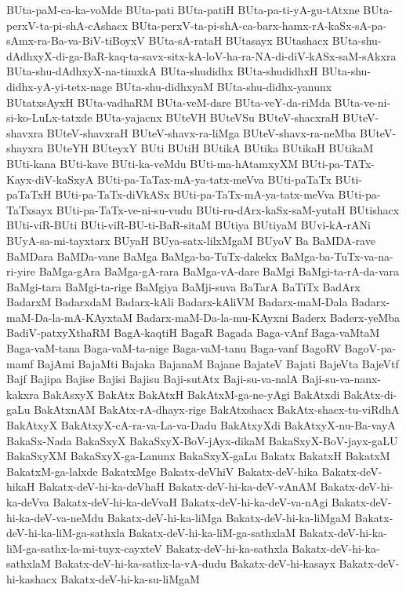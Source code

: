 {BUta-paM-ca-ka-voMde
BUta-pati
BUta-patiH
BUta-pa-ti-yA-gu-tAtxne
BUta-perxV-ta-pi-shA-cAshacx
BUta-perxV-ta-pi-shA-ca-barx-hamx-rA-kaSx-sA-pa-sAmx-ra-Ba-va-BiV-tiBoyxV
BUta-sA-rataH
BUtasayx
BUtashacx
BUta-shu-dAdhxyX-di-ga-BaR-kaq-ta-savx-sitx-kA-loV-ha-ra-NA-di-diV-kASx-saM-sAkxra
BUta-shu-dAdhxyX-na-timxkA
BUta-shudidhx
BUta-shudidhxH
BUta-shu-didhx-yA-yi-tetx-nage
BUta-shu-didhxyaM
BUta-shu-didhx-yanunx
BUtatxsAyxH
BUta-vadhaRM
BUta-veM-dare
BUta-veY-da-riMda
BUta-ve-ni-si-ko-LuLx-tatxde
BUta-yajacnx
BUteVH
BUteVSu
BUteV-shacxraH
BUteV-shavxra
BUteV-shavxraH
BUteV-shavx-ra-liMga
BUteV-shavx-ra-neMba
BUteV-shayxra
BUteYH
BUteyxY
BUti
BUtiH
BUtikA
BUtika
BUtikaH
BUtikaM
BUti-kana
BUti-kave
BUti-ka-veMdu
BUti-ma-hAtamxyXM
BUti-pa-TATx-Kayx-diV-kaSxyA
BUti-pa-TaTax-mA-ya-tatx-meVva
BUti-paTaTx
BUti-paTaTxH
BUti-pa-TaTx-diVkASx
BUti-pa-TaTx-mA-ya-tatx-meVva
BUti-pa-TaTxsayx
BUti-pa-TaTx-ve-ni-su-vudu
BUti-ru-dArx-kaSx-saM-yutaH
BUtishacx
BUti-viR-BUti
BUti-viR-BU-ti-BaR-sitaM
BUtiya
BUtiyaM
BUvi-kA-rANi
BUyA-sa-mi-tayxtarx
BUyaH
BUya-satx-lilxMgaM
BUyoV
Ba
BaMDA-rave
BaMDara
BaMDa-vane
BaMga
BaMga-ba-TuTx-dakekx
BaMga-ba-TuTx-va-na-ri-yire
BaMga-gAra
BaMga-gA-rara
BaMga-vA-dare
BaMgi
BaMgi-ta-rA-da-vara
BaMgi-tara
BaMgi-ta-rige
BaMgiya
BaMji-suva
BaTarA
BaTiTx
BadArx
BadarxM
BadarxdaM
Badarx-kAli
Badarx-kAliVM
Badarx-maM-Dala
Badarx-maM-Da-la-mA-KAyxtaM
Badarx-maM-Da-la-mu-KAyxni
Baderx
Baderx-yeMba
BadiV-patxyXthaRM
BagA-kaqtiH
BagaR
Bagada
Baga-vAnf
Baga-vaMtaM
Baga-vaM-tana
Baga-vaM-ta-nige
Baga-vaM-tanu
Baga-vanf
BagoRV
BagoV-pa-mamf
BajAmi
BajaMti
Bajaka
BajanaM
Bajane
BajateV
Bajati
BajeVta
BajeVtf
Bajf
Bajipa
Bajise
Bajisi
Bajisu
Baji-sutAtx
Baji-su-va-nalA
Baji-su-va-nanx-kakxra
BakAsxyX
BakAtx
BakAtxH
BakAtxM-ga-ne-yAgi
BakAtxdi
BakAtx-di-gaLu
BakAtxnAM
BakAtx-rA-dhayx-rige
BakAtxshacx
BakAtx-shacx-tu-viRdhA
BakAtxyX
BakAtxyX-cA-ra-va-La-va-Dadu
BakAtxyXdi
BakAtxyX-nu-Ba-vayA
BakaSx-Nada
BakaSxyX
BakaSxyX-BoV-jAyx-dikaM
BakaSxyX-BoV-jayx-gaLU
BakaSxyXM
BakaSxyX-ga-Lanunx
BakaSxyX-gaLu
Bakatx
BakatxH
BakatxM
BakatxM-ga-lalxde
BakatxMge
Bakatx-deVhiV
Bakatx-deV-hika
Bakatx-deV-hikaH
Bakatx-deV-hi-ka-deVhaH
Bakatx-deV-hi-ka-deV-vAnAM
Bakatx-deV-hi-ka-deVva
Bakatx-deV-hi-ka-deVvaH
Bakatx-deV-hi-ka-deV-va-nAgi
Bakatx-deV-hi-ka-deV-va-neMdu
Bakatx-deV-hi-ka-liMga
Bakatx-deV-hi-ka-liMgaM
Bakatx-deV-hi-ka-liM-ga-sathxla
Bakatx-deV-hi-ka-liM-ga-sathxlaM
Bakatx-deV-hi-ka-liM-ga-sathx-la-mi-tuyx-cayxteV
Bakatx-deV-hi-ka-sathxla
Bakatx-deV-hi-ka-sathxlaM
Bakatx-deV-hi-ka-sathx-la-vA-dudu
Bakatx-deV-hi-kasayx
Bakatx-deV-hi-kashacx
Bakatx-deV-hi-ka-su-liMgaM
}
